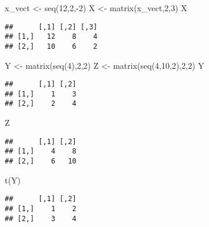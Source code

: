 \documentclass[
]{article}
\newenvironment{Shaded}{\begin{snugshade}}{\end{snugshade}}
\newcommand{\DecValTok}[1]{\textcolor[rgb]{0.00,0.00,0.81}{#1}}
\newcommand{\FunctionTok}[1]{\textcolor[rgb]{0.00,0.00,0.00}{#1}}
\newcommand{\NormalTok}[1]{#1}
\newcommand{\OtherTok}[1]{\textcolor[rgb]{0.56,0.35,0.01}{#1}}
\newcommand{\SpecialCharTok}[1]{\textcolor[rgb]{0.00,0.00,0.00}{#1}}
\begin{document}
\begin{Shaded}
\begin{Highlighting}[]
\NormalTok{x\_vect }\OtherTok{\textless{}{-}} \FunctionTok{seq}\NormalTok{(}\DecValTok{12}\NormalTok{,}\DecValTok{2}\NormalTok{,}\SpecialCharTok{{-}}\DecValTok{2}\NormalTok{)}
\NormalTok{X }\OtherTok{\textless{}{-}} \FunctionTok{matrix}\NormalTok{(x\_vect,}\DecValTok{2}\NormalTok{,}\DecValTok{3}\NormalTok{)}
\NormalTok{X}
\end{Highlighting}
\end{Shaded}

\begin{verbatim}
##      [,1] [,2] [,3]
## [1,]   12    8    4
## [2,]   10    6    2
\end{verbatim}

\begin{Shaded}
\begin{Highlighting}[]
\NormalTok{Y }\OtherTok{\textless{}{-}} \FunctionTok{matrix}\NormalTok{(}\FunctionTok{seq}\NormalTok{(}\DecValTok{4}\NormalTok{),}\DecValTok{2}\NormalTok{,}\DecValTok{2}\NormalTok{)}
\NormalTok{Z }\OtherTok{\textless{}{-}} \FunctionTok{matrix}\NormalTok{(}\FunctionTok{seq}\NormalTok{(}\DecValTok{4}\NormalTok{,}\DecValTok{10}\NormalTok{,}\DecValTok{2}\NormalTok{),}\DecValTok{2}\NormalTok{,}\DecValTok{2}\NormalTok{)}
\NormalTok{Y}
\end{Highlighting}
\end{Shaded}

\begin{verbatim}
##      [,1] [,2]
## [1,]    1    3
## [2,]    2    4
\end{verbatim}

\begin{Shaded}
\begin{Highlighting}[]
\NormalTok{Z}
\end{Highlighting}
\end{Shaded}

\begin{verbatim}
##      [,1] [,2]
## [1,]    4    8
## [2,]    6   10
\end{verbatim}

\begin{Shaded}
\begin{Highlighting}[]
\FunctionTok{t}\NormalTok{(Y)}
\end{Highlighting}
\end{Shaded}

\begin{verbatim}
##      [,1] [,2]
## [1,]    1    2
## [2,]    3    4
\end{verbatim}
\end{document}
